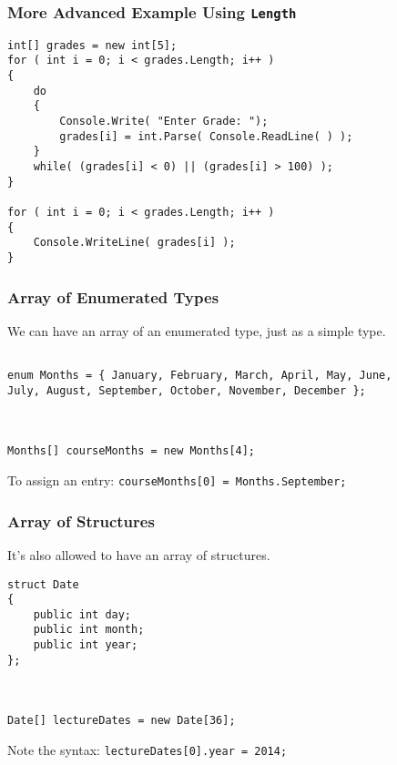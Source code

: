 \begin{frame}[fragile]
\frametitle{More Advanced Example Using \texttt{Length}}

\begin{verbatim}
int[] grades = new int[5];
for ( int i = 0; i < grades.Length; i++ )
{
    do
    {
        Console.Write( "Enter Grade: ");
        grades[i] = int.Parse( Console.ReadLine( ) );
    }
    while( (grades[i] < 0) || (grades[i] > 100) );
}

for ( int i = 0; i < grades.Length; i++ )
{
    Console.WriteLine( grades[i] );
}
\end{verbatim}

\end{frame}

\begin{frame}[fragile]
\frametitle{Array of Enumerated Types}

We can have an array of an enumerated type, just as a simple type.

\begin{verbatim}

enum Months = { January, February, March, April, May, June, 
July, August, September, October, November, December };



Months[] courseMonths = new Months[4];

\end{verbatim}

To assign an entry: \texttt{courseMonths[0] = Months.September;}

\end{frame}


\begin{frame}[fragile]
\frametitle{Array of Structures}
It's also allowed to have an array of structures.

\begin{verbatim}
struct Date
{
    public int day;
    public int month;
    public int year;
};



Date[] lectureDates = new Date[36];
\end{verbatim}

Note the syntax: \texttt{lectureDates[0].year = 2014;}

\end{frame}




